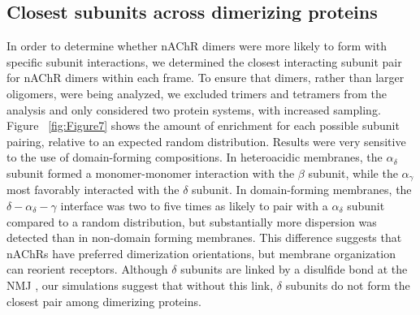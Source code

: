 

\subsection{Closest subunits across dimerizing proteins}
In order to determine whether nAChR dimers were more likely to form with specific subunit interactions, we determined the closest interacting subunit pair for nAChR dimers within each frame. To ensure that dimers, rather than larger oligomers, were being analyzed, we excluded trimers and tetramers from the analysis and only considered two protein systems, with increased sampling. Figure ~\ref{fig:Figure7} shows the amount of enrichment for each possible subunit pairing, relative to an expected random distribution. Results were very sensitive to the use of domain-forming compositions. In heteroacidic membranes, the $\alpha_{\delta}$ subunit formed a monomer-monomer interaction with the $\beta$ subunit, while the $\alpha_{\gamma}$ most favorably interacted with the $\delta$ subunit. In domain-forming membranes,  the $\delta-\alpha_{\delta}-\gamma$ interface was two to five times as likely to pair with a $\alpha_{\delta}$ subunit compared to a random distribution, but substantially more dispersion was detected than in non-domain forming membranes. This difference suggests that nAChRs have preferred dimerization orientations, but membrane organization can reorient receptors. Although $\delta$ subunits are linked by a disulfide bond at the NMJ \citep{Chang1977}, our simulations suggest that without this link, $\delta$ subunits do not form the closest pair among dimerizing proteins.

